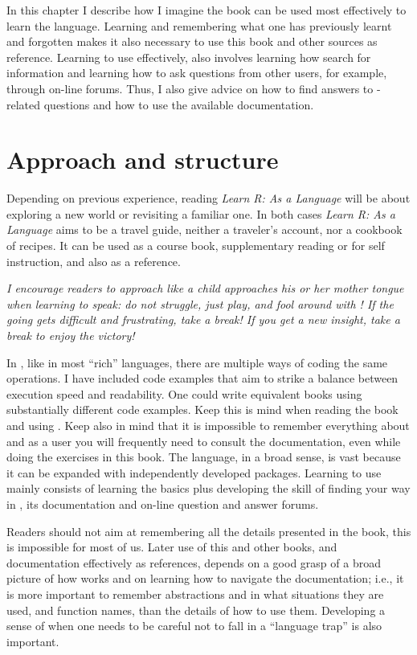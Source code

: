\documentclass[krantz2]{krantz}\usepackage{knitr}
\begin{document}
In this chapter I describe how I imagine the book can be used most effectively to learn the \Rlang language. Learning \Rlang and remembering what one has previously learnt and forgotten makes it also necessary to use this book and other sources as reference. Learning to use \Rlang effectively, also involves learning how search for information and learning how to ask questions from other users, for example, through on-line forums. Thus, I also give advice on how to find answers to \Rlang-related questions and how to use the available documentation.

\section{Approach and structure}

Depending on previous experience, reading \emph{Learn R: As a Language} will be about exploring a new world or revisiting a familiar one. In both cases \emph{Learn R: As a Language} aims to be a travel guide, neither a traveler's account, nor a cookbook of \Rlang recipes. It can be used as a course book, supplementary reading or for self instruction, and also as a reference.\vspace{1ex}

\noindent
\emph{I encourage readers to approach \Rlang like a child approaches his or her mother tongue when learning to speak: do not struggle, just play, and fool around with \Rlang! If the going gets difficult and frustrating, take a break! If you get a new insight, take a break to enjoy the victory!\vspace{1ex}
}

In \Rlang, like in most ``rich'' languages, there are multiple ways of coding the same operations. I have included code examples that aim to strike a balance between execution speed and readability. One could write equivalent \Rlang books using substantially different code examples. Keep this is mind when reading the book and using \Rlang. Keep also in mind that it is impossible to remember everything about \Rlang and as a user you will frequently need to consult the documentation, even while doing the exercises in this book. The \Rlang language, in a broad sense, is vast because it can be expanded with independently developed packages. Learning to use \Rlang mainly consists of learning the basics plus developing the skill of finding your way in \Rlang, its documentation and on-line question and answer forums.

Readers should not aim at remembering all the details presented in the book, this is impossible for most of us. Later use of this and other books, and documentation effectively as references, depends on a good grasp of a broad picture of how \Rlang works and on learning how to navigate the documentation; i.e., it is more important to remember abstractions and in what situations they are used, and function names, than the details of how to use them. Developing a sense of when one needs to be careful not to fall in a ``language trap'' is also important.
\end{document}
